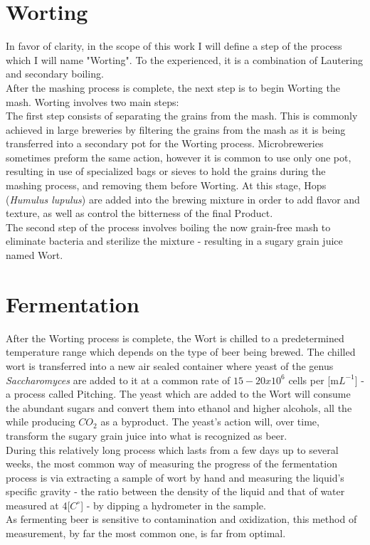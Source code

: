 \documentclass[twoside]{ctuthesis}
\theoremstyle{plain}
\theoremstyle{definition}
\theoremstyle{note}
\begin{document}
\section{Worting}
In favor of clarity, in the scope of this work I will define a step of the process which I will name "Worting". To the experienced, it is a combination of Lautering and secondary boiling.\\
After the mashing process is complete, the next step is to begin Worting the mash. Worting involves two main steps:\\
The first step consists of separating the grains from the mash. This is commonly achieved in large breweries by filtering the grains from the mash as it is being transferred into a secondary pot for the Worting process. Microbreweries sometimes preform the same action, however it is common to use only one pot, resulting in use of specialized bags or sieves to hold the grains during the mashing process, and removing them before Worting. At this stage, Hops (\textit{Humulus lupulus}) are added into the brewing mixture in order to add flavor and texture, as well as control the bitterness of the final Product.\cite{Hops}\\
The second step of the process involves boiling the now grain-free mash to eliminate bacteria and sterilize the mixture - resulting in a sugary grain juice named Wort.

\pagebreak

\section{Fermentation}
After the Worting process is complete, the Wort is chilled to a predetermined temperature range which depends on the type of beer being brewed. The chilled wort is transferred into a new air sealed container where yeast of the genus \textit{Saccharomyces} are added to it at a common rate of $15-20 x 10^6$ cells per [m$L^{-1}$] - a process called Pitching. The yeast which are added to the Wort will consume the abundant sugars and convert them into ethanol and higher alcohols, all the while producing $CO_2$ as a byproduct. The yeast's action will, over time, transform the sugary grain juice into what is recognized as beer.\\
During this relatively long process which lasts from a few days up to several weeks, the most common way of measuring the progress of the fermentation process is via extracting a sample of wort by hand and measuring the liquid's specific gravity - the ratio between the density of the liquid and that of water measured at 4[$C^\circ$] - by dipping a hydrometer in the sample.\\
As fermenting beer is sensitive to contamination and oxidization, this method of measurement, by far the most common one, is far from optimal. \cite{Biochemistry}
\end{document}
